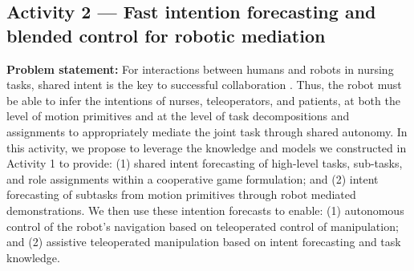 \documentclass[letterpaper, 11 pt, onecolumn]{article}
\begin{document}


 










\subsection{Activity 2 --- Fast intention forecasting and blended control for robotic mediation}\label{sec:plan-intent}
\noindent
{\bf Problem statement:} For interactions between humans and robots in nursing tasks, shared intent is the key to successful collaboration \cite{cite}.
Thus, the robot must be able to infer the intentions of nurses, teleoperators, and patients, at both the level of motion primitives and at the level of task decompositions and assignments to appropriately mediate the joint task through shared autonomy. In this activity, we propose to leverage the knowledge and models we constructed in Activity 1 to provide: (1) shared intent forecasting of high-level tasks, sub-tasks, and role assignments within a cooperative game formulation; and (2) intent forecasting of subtasks from motion primitives through robot mediated demonstrations.  We then use these intention forecasts to enable: (1) autonomous control of the robot's navigation based on teleoperated control of manipulation; and (2) assistive teleoperated manipulation based on intent forecasting and task knowledge.
\end{document}
